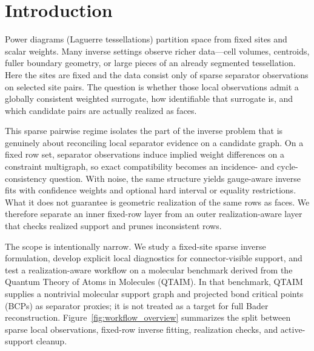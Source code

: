 \documentclass[preprint,12pt]{elsarticle}
\begin{document}
\section{Introduction}
\label{sec:intro}

Power diagrams (Laguerre tessellations) partition space from fixed
sites and scalar weights. Many inverse settings observe richer data---cell
volumes, centroids, fuller boundary geometry, or large pieces of an already
segmented tessellation. Here the sites are fixed and the data consist only of
sparse separator observations on selected site pairs. The question is whether
those local observations admit a globally consistent weighted surrogate, how
identifiable that surrogate is, and which candidate pairs are actually
realized as faces.

This sparse pairwise regime isolates the part of the inverse problem that is
genuinely about reconciling local separator evidence on a candidate graph. On a
fixed row set, separator observations induce implied weight differences on a
constraint multigraph, so exact compatibility becomes an incidence- and
cycle-consistency question. With noise, the same structure yields gauge-aware
inverse fits with confidence weights and optional hard interval or equality
restrictions. What it does not guarantee is geometric realization of the same
rows as faces. We therefore separate an inner fixed-row layer from an outer
realization-aware layer that checks realized support and prunes inconsistent
rows.

The scope is intentionally narrow. We study a fixed-site sparse inverse
formulation, develop explicit local diagnostics for connector-visible support,
and test a realization-aware workflow on a molecular benchmark derived from the
Quantum Theory of Atoms in Molecules (QTAIM). In that benchmark, QTAIM supplies
a nontrivial molecular support graph and projected bond critical points (BCPs)
as separator proxies; it is not treated as a target for full Bader reconstruction.
Figure~\ref{fig:workflow_overview} summarizes the split between sparse local
observations, fixed-row inverse fitting, realization checks, and active-support
cleanup.
\end{document}
